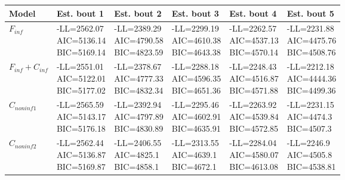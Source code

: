 \begin{tabular}{llllll}
Model & Est. bout 1 & Est. bout 2 & Est. bout 3 & Est. bout 4 & Est. bout 5 \\ 
\hline 
$F_{inf}$ & \makecell{-LL=2562.07\\AIC=5136.14\\BIC=5169.14} & \makecell{-LL=2389.29\\AIC=4790.58\\BIC=4823.59} & \makecell{-LL=2299.19\\AIC=4610.38\\BIC=4643.38} & \makecell{-LL=2262.57\\AIC=4537.13\\BIC=4570.14} & \makecell{-LL=2231.88\\AIC=4475.76\\BIC=4508.76} \\ 
$F_{inf}+C_{inf}$ & \makecell{-LL=2551.01\\AIC=5122.01\\BIC=5177.02} & \makecell{-LL=2378.67\\AIC=4777.33\\BIC=4832.34} & \makecell{-LL=2288.18\\AIC=4596.35\\BIC=4651.36} & \makecell{-LL=2248.43\\AIC=4516.87\\BIC=4571.88} & \makecell{-LL=2212.18\\AIC=4444.36\\BIC=4499.36} \\ 
$C_{noninf1}$ & \makecell{-LL=2565.59\\AIC=5143.17\\BIC=5176.18} & \makecell{-LL=2392.94\\AIC=4797.89\\BIC=4830.89} & \makecell{-LL=2295.46\\AIC=4602.91\\BIC=4635.91} & \makecell{-LL=2263.92\\AIC=4539.84\\BIC=4572.85} & \makecell{-LL=2231.15\\AIC=4474.3\\BIC=4507.3} \\ 
$C_{noninf2}$ & \makecell{-LL=2562.44\\AIC=5136.87\\BIC=5169.87} & \makecell{-LL=2406.55\\AIC=4825.1\\BIC=4858.1} & \makecell{-LL=2313.55\\AIC=4639.1\\BIC=4672.1} & \makecell{-LL=2284.04\\AIC=4580.07\\BIC=4613.08} & \makecell{-LL=2246.9\\AIC=4505.8\\BIC=4538.81} \\ 

\end{tabular}

